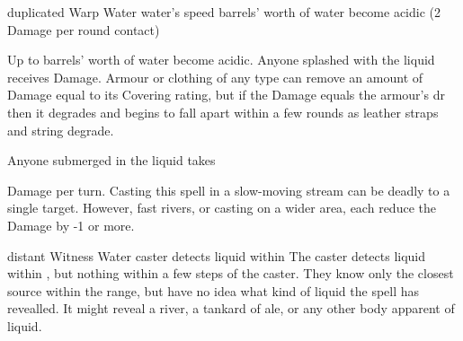   {duplicated}%
  {Warp}%
  {Water}%
  {water's speed}%
  { barrels' worth of water become acidic (2 Damage per round contact)}%
  {
    Up to  barrels' worth of water become acidic.
    Anyone splashed with the liquid receives  Damage. 
    Armour or clothing of any type can remove an amount of Damage equal to its Covering rating, but if the Damage equals the armour's \gls{dr} then it degrades and begins to fall apart within a few rounds as leather straps and string degrade.

    Anyone submerged in the liquid takes \addtocounter{spellCost}{2}  Damage per turn.
    Casting this spell in a slow-moving stream can be deadly to a single target.
    However, fast rivers, or casting on a wider area, each reduce the Damage by -1 or more.
  }

  {distant}%
  {Witness}%
  {Water}%
  {}%
  {caster detects liquid within \spellRange}%
  {
    The caster detects liquid within \spellRange, but nothing within a few steps of the caster.
    They know only the closest source within the range, but have no idea what kind of liquid the spell has revealled.
    It might reveal a river, a tankard of ale, or any other body apparent of liquid.
  }
